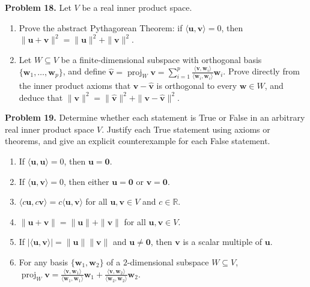 \documentclass[11pt, letterpaper]{article}
\theoremstyle{definition}
\theoremstyle{remark}
\begin{document}
\textbf{Problem 18.} Let $V$ be a real inner product space.
\begin{enumerate}[label=(\alph*)]
    \item Prove the abstract Pythagorean Theorem: if $\langle \mathbf{u}, \mathbf{v} \rangle = 0$, then $\|\mathbf{u} + \mathbf{v}\|^2 = \|\mathbf{u}\|^2 + \|\mathbf{v}\|^2$.
    \item Let $W \subseteq V$ be a finite-dimensional subspace with orthogonal basis $\{\mathbf{w}_1, \dots, \mathbf{w}_p\}$, and define $\hat{\mathbf{v}} = \operatorname{proj}_W \mathbf{v} = \sum_{i=1}^p \frac{\langle \mathbf{v}, \mathbf{w}_i \rangle}{\langle \mathbf{w}_i, \mathbf{w}_i \rangle}\mathbf{w}_i$. Prove directly from the inner product axioms that $\mathbf{v} - \hat{\mathbf{v}}$ is orthogonal to every $\mathbf{w} \in W$, and deduce that $\|\mathbf{v}\|^2 = \|\hat{\mathbf{v}}\|^2 + \|\mathbf{v} - \hat{\mathbf{v}}\|^2$.
\end{enumerate}

\textbf{Problem 19.} Determine whether each statement is True or False in an arbitrary real inner product space $V$. Justify each True statement using axioms or theorems, and give an explicit counterexample for each False statement.
\begin{enumerate}[label=(\alph*)]
    \item If $\langle \mathbf{u}, \mathbf{u} \rangle = 0$, then $\mathbf{u} = \mathbf{0}$.
    \item If $\langle \mathbf{u}, \mathbf{v} \rangle = 0$, then either $\mathbf{u} = \mathbf{0}$ or $\mathbf{v} = \mathbf{0}$.
    \item $\langle c\mathbf{u}, c\mathbf{v} \rangle = c\langle \mathbf{u}, \mathbf{v} \rangle$ for all $\mathbf{u}, \mathbf{v} \in V$ and $c \in \mathbb{R}$.
    \item $\|\mathbf{u} + \mathbf{v}\| = \|\mathbf{u}\| + \|\mathbf{v}\|$ for all $\mathbf{u}, \mathbf{v} \in V$.
    \item If $|\langle \mathbf{u}, \mathbf{v} \rangle| = \|\mathbf{u}\|\|\mathbf{v}\|$ and $\mathbf{u} \neq \mathbf{0}$, then $\mathbf{v}$ is a scalar multiple of $\mathbf{u}$.
    \item For any basis $\{\mathbf{w}_1, \mathbf{w}_2\}$ of a $2$-dimensional subspace $W \subseteq V$, $\operatorname{proj}_W \mathbf{v} = \frac{\langle \mathbf{v}, \mathbf{w}_1 \rangle}{\langle \mathbf{w}_1, \mathbf{w}_1 \rangle}\mathbf{w}_1 + \frac{\langle \mathbf{v}, \mathbf{w}_2 \rangle}{\langle \mathbf{w}_2, \mathbf{w}_2 \rangle}\mathbf{w}_2$.
\end{enumerate}
\end{document}
